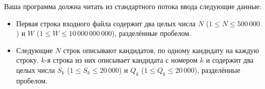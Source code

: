 Ваша программа должна читать из стандартного потока ввода следующие данные:
\begin{itemize}
\item Первая строка входного файла содержит два целых числа $N$ ($1 \le N \le 500\,000$) и $W$ ($1 \le W \le 10\,000\,000\,000$), разделённые пробелом.
\item Следующие $N$ строк описывают кандидатов, по одному кандидату на каждую строку. $k$-я
строка из них описывает кандидата с номером $k$ и содержит два целых числа $S_k$ ($1 \le S_k \le 20\,000$) и $Q_k$ ($1 \le Q_k \le 20\,000$), разделённые пробелом.
\end{itemize}